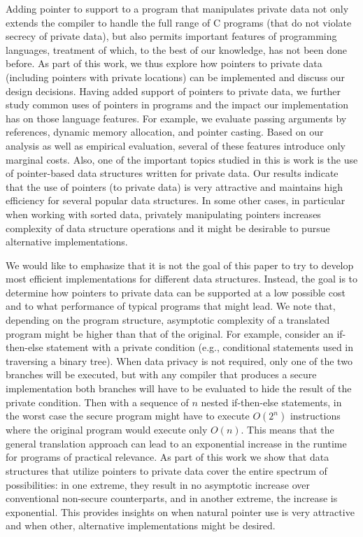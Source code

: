 \documentclass[11pt]{article}
\begin{document}
Adding pointer to support to a program that manipulates private data not
only extends the compiler to handle the full range of C programs (that do
not violate secrecy of private data), but also permits important features of
programming languages, treatment of which, to the best of our knowledge, has
not been done before. As part of this work, we thus explore how pointers to
private data (including pointers with private locations) can be implemented
and discuss our design decisions. Having added support of
pointers to private data, we further study common uses of pointers in
programs and the impact our implementation has on those language features.
For example, we evaluate passing arguments by references, dynamic memory
allocation, and pointer casting. Based on our analysis as well as empirical
evaluation, several of these features introduce only marginal costs. Also, one
of the important topics studied in this is work is the use of pointer-based
data structures written for private data. Our results indicate that the use
of pointers (to private data) is very attractive and maintains high
efficiency for several popular data structures. In some other cases, in
particular when working with sorted data, privately manipulating pointers
increases complexity of data structure operations and it might be desirable
to pursue alternative implementations. 

We would like to emphasize that it is not the goal of this paper to try to
develop most efficient implementations for different data structures.
Instead, the goal is to determine how pointers to private data can be
supported at a low possible cost and to what performance of typical
programs that might lead. We note that, depending on the program structure,
asymptotic complexity of a translated program might be higher than that of
the original. For example, consider an if-then-else statement with a private
condition (e.g., conditional statements used in traversing a binary tree).
When data privacy is not required, only one of the two branches will be
executed, but with any compiler that produces a secure implementation both
branches will have to be evaluated to hide the result of the private
condition. Then with a sequence of $n$ nested if-then-else statements, in
the worst case the secure program might have to execute $O(2^n)$
instructions where the original program would execute only $O(n)$. This
means that the general translation approach can lead to an exponential
increase in the runtime for programs of practical relevance. As part of this
work we show that data structures that utilize pointers to private data
cover the entire spectrum of possibilities: in one extreme, they result in
no asymptotic increase over conventional non-secure counterparts, and in
another extreme, the increase is exponential. This provides insights on when
natural pointer use is very attractive and when other, alternative
implementations might be desired.
\end{document}

